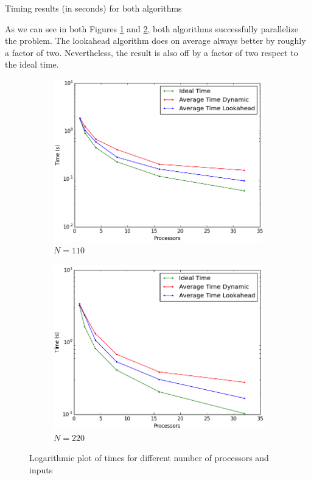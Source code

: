 \documentclass[letterpaper,twoside,11pt]{article}
\begin{document}
\begin{multicols}{2}
\begin{table}[H]
    \caption{Timing results (in seconds) for both algorithms }
    \label{tab:Times}
\end{table}

As we can see in both Figures \ref{fig:times110} and \ref{fig:times220}, both algorithms successfully parallelize the problem. The lookahead algorithm does on average always better by roughly a factor of two. Nevertheless, the result is also off by a factor of two respect to the ideal time.

\begin{figure}
  \centering
  \begin{subfigure}{.5\textwidth}
    \centering
    \includegraphics[width=.93\textwidth]{../3 Analysis/time_110.png}
    \caption{$N = 110$}
    \label{fig:times110}
  \end{subfigure}%
  \begin{subfigure}{.5\textwidth}
    \centering
    \includegraphics[width=.93\textwidth]{../3 Analysis/time_220.png}
    \caption{$N = 220$}
    \label{fig:times220}
  \end{subfigure}
  \caption{Logarithmic plot of times for different number of processors and inputs}
  \label{fig:times}
\end{figure}


\end{multicols}
\end{document}
